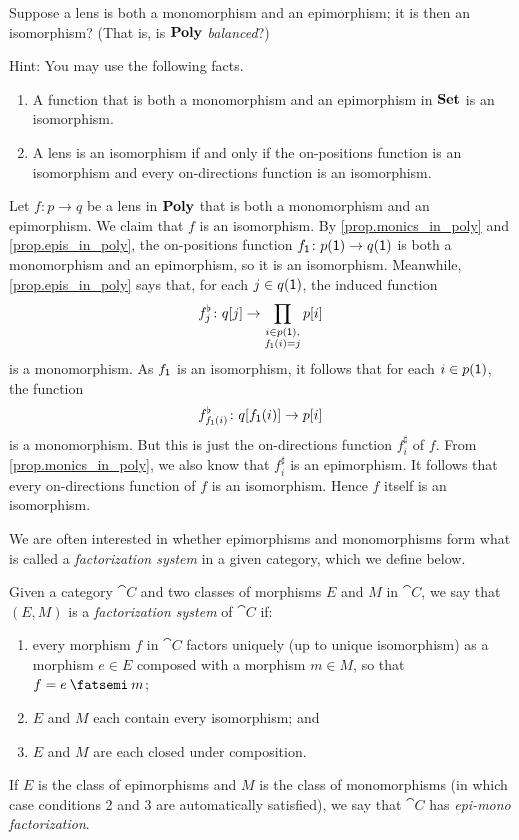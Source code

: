 \documentclass[Book-Poly]{subfiles}
\begin{document}
\begin{exercise}
Suppose a lens is both a monomorphism and an epimorphism; it is then an isomorphism? (That is, is $\mathbf{Poly}$ \emph{balanced}?)

Hint: You may use the following facts.
\begin{enumerate}
    \item A function that is both a monomorphism and an epimorphism in $\mathbf{Set}$ is an isomorphism.
    \item A lens is an isomorphism if and only if the on-positions function is an isomorphism and every on-directions function is an isomorphism.
\end{enumerate}
\begin{solution}
Let $f \colon p \to q$ be a lens in $\mathbf{Poly}$ that is both a monomorphism and an epimorphism.
We claim that $f$ is an isomorphism.
By \cref{prop.monics_in_poly} and \cref{prop.epis_in_poly}, the on-positions function $f_{\textsf{1}} \colon p(\textsf{1}) \to q(\textsf{1})$ is both a monomorphism and an epimorphism, so it is an isomorphism.
Meanwhile, \cref{prop.epis_in_poly} says that, for each $j \in q(\textsf{1})$, the induced function
\[
    f^\flat_j \colon q[j] \to \prod_{\substack{i \in p(\textsf{1}), \\ f_{\textsf{1}}(i) = j}} p[i]
\]
is a monomorphism.
As $f_{\textsf{1}}$ is an isomorphism, it follows that for each $i \in p(\textsf{1})$, the function
\[
    f^\flat_{f_{\textsf{1}}(i)} \colon q[f_{\textsf{1}}(i)] \to p[i]
\]
is a monomorphism.
But this is just the on-directions function $f^\sharp_i$ of $f$.
From \cref{prop.monics_in_poly}, we also know that $f^\sharp_i$ is an epimorphism.
It follows that every on-directions function of $f$ is an isomorphism.
Hence $f$ itself is an isomorphism.
\end{solution}
\end{exercise}

We are often interested in whether epimorphisms and monomorphisms form what is called a \emph{factorization system} in a given category, which we define below.

\begin{definition} \label{def.factor}
Given a category $\cat{C}$ and two classes of morphisms $E$ and $M$ in $\cat{C}$, we say that $(E, M)$ is a \emph{factorization system} of $\cat{C}$ if:
\begin{enumerate}
    \item every morphism $f$ in $\cat{C}$ factors uniquely (up to unique isomorphism) as a morphism $e \in E$ composed with a morphism $m\in M$, so that $f = e\then m$;
    \item $E$ and $M$ each contain every isomorphism; and
    \item $E$ and $M$ are each closed under composition.
\end{enumerate}
If $E$ is the class of epimorphisms and $M$ is the class of monomorphisms (in which case conditions 2 and 3 are automatically satisfied), we say that $\cat{C}$ has \emph{epi-mono factorization}.
\end{definition}
\end{document}
